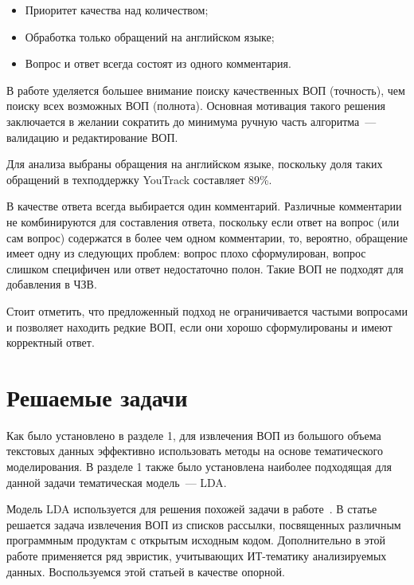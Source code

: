 \begin{itemize}
\item Приоритет качества над количеством;
\item Обработка только обращений на английском языке;
\item Вопрос и ответ всегда состоят из одного комментария.
\end{itemize}

В работе уделяется большее внимание поиску качественных ВОП (точность), чем поиску всех возможных ВОП (полнота). Основная мотивация такого решения заключается в желании сократить до минимума ручную часть алгоритма~--- валидацию и редактирование ВОП.

Для анализа выбраны обращения на английском языке, поскольку доля таких обращений в техподдержку YouTrack составляет 89\%. 

В качестве ответа всегда выбирается один комментарий. Различные комментарии не комбинируются для составления ответа, поскольку если ответ на вопрос (или сам вопрос) содержатся в более чем одном комментарии, то, вероятно, обращение имеет одну из следующих проблем: вопрос плохо сформулирован, вопрос слишком специфичен или ответ недостаточно полон. Такие ВОП не подходят для добавления в ЧЗВ.

Стоит отметить, что предложенный подход не ограничивается частыми вопросами и позволяет находить редкие ВОП, если они хорошо сформулированы и имеют корректный ответ.

\section{Решаемые задачи}
\label{sec:tasks}

Как было установлено в разделе 1, для извлечения ВОП из большого объема текстовых данных эффективно использовать методы на основе тематического моделирования. В разделе 1 также было установлена наиболее подходящая для данной задачи тематическая модель~--- LDA.

Модель LDA используется для решения похожей задачи в работе~\cite{original}. В статье~\cite{original} решается задача извлечения ВОП из списков рассылки, посвященных различным программным продуктам с открытым исходным кодом. Дополнительно в этой работе применяется ряд эвристик, учитывающих ИТ-тематику анализируемых данных. Воспользуемся этой статьей в качестве опорной.

